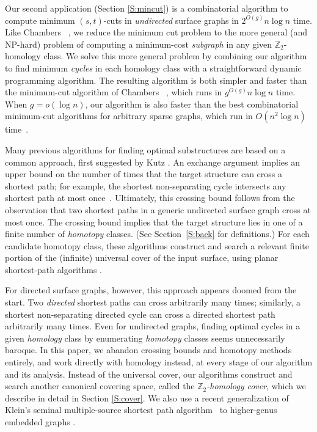 \documentclass[twoside,leqno,twocolumn]{article}
\def\Z{\mathbb{Z}}
\begin{document}
Our second application (Section \ref{S:mincut}) is a combinatorial algorithm to compute minimum $(s,t)$-cuts in \emph{undirected} surface graphs in $2^{O(g)} n\log n$ time.  Like Chambers \etal~\cite{surfcut}, we reduce the minimum cut problem to the more general (and {NP}-hard) problem of computing a minimum-cost \emph{subgraph} in any given $\Z_2$-homology class.  We solve this more general problem by combining our algorithm to find minimum \emph{cycles} in each homology class with a straightforward dynamic programming algorithm.  The resulting algorithm is both simpler and faster  than the minimum-cut algorithm of Chambers \etal~\cite{surfcut}, which runs in $g^{O(g)} n\log n$ time.  When $g = o(\log n)$, our algorithm is also faster than the best combinatorial minimum-cut algorithms for arbitrary sparse graphs, which run in $O(n^2\log n)$ time~\cite{st-dsdt-83, gt-namfp-88}.

Many previous algorithms for finding optimal substructures are based on a common approach, first suggested by Kutz \cite{k-csnco-06}.  An exchange argument implies an upper bound on the number of times that the target structure can cross a shortest path; for example, the shortest non-separating cycle intersects any shortest path at most once~\cite{cm-fsnsn-07}.  Ultimately, this crossing bound follows from the observation that two shortest paths in a generic undirected surface graph cross at most once.  The crossing bound implies that the target structure lies in one of a finite number of \emph{homotopy} classes.  (See Section~\ref{S:back} for definitions.)  For each candidate homotopy class, these algorithms construct and search a relevant finite portion of the (infinite) universal cover of the input surface, using planar shortest-path algorithms \cite{hkrs-fspap-97, k-msspp-05}.

For directed surface graphs, however, this approach appears doomed from the start.  Two \emph{directed} shortest paths can cross arbitrarily many times; similarly, a shortest non-separating directed cycle can cross a directed shortest path arbitrarily many times.  Even for undirected graphs, finding optimal cycles in a given \emph{homology} class by enumerating \emph{homotopy} classes seems unnecessarily baroque.  In this paper, we abandon crossing bounds and homotopy methods entirely, and work directly with homology instead, at every stage of our algorithm and its analysis.  Instead of the universal cover, our algorithms construct and search another canonical covering space, called the \emph{$\Z_2$-homology cover}, which we describe in detail in Section \ref{S:cover}.  We also use a recent generalization of Klein's seminal multiple-source shortest path algorithm~\cite{k-msspp-05} to higher-genus embedded graphs \cite{cc-msspg-07,multishort}.
\end{document}
